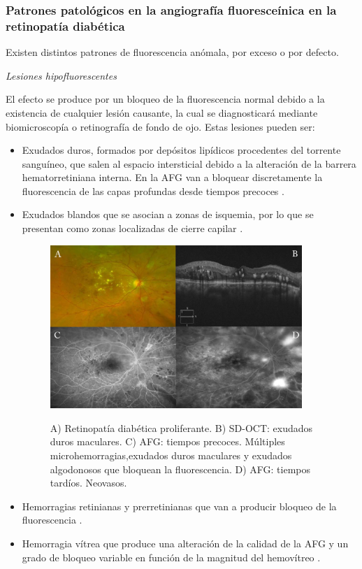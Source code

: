 \subsubsection{Patrones patológicos en la angiografía fluoresceínica en la retinopatía diabética}

Existen distintos patrones de fluorescencia anómala, por exceso o por defecto.
\\
 
  
\begin{large}
 \textit{Lesiones hipofluorescentes}
\end{large}

El efecto se produce por un bloqueo de la fluorescencia normal debido a la existencia de cualquier lesión causante, la cual se diagnosticará mediante biomicroscopía o retinografía de fondo de ojo. Estas lesiones pueden ser:
\begin{itemize}
\item Exudados duros, formados por depósitos lipídicos procedentes del torrente sanguíneo, que salen al espacio intersticial debido a la alteración de la barrera hematorretiniana interna. En la AFG van a bloquear discretamente la fluorescencia de las capas profundas desde tiempos precoces .
\item Exudados blandos que se asocian a zonas de isquemia, por lo que se presentan como zonas localizadas de cierre capilar .

\begin{figure}[H]
\centering
\includegraphics[width=0.9\textwidth]{./Figures/AF_HIPOFLUORECINA.png}
\label{fig:lightfilter}
\caption{ A) Retinopatía diabética proliferante. B) SD-OCT: exudados duros maculares. C) AFG: tiempos precoces. Múltiples microhemorragias,exudados duros maculares y exudados algodonosos que bloquean la fluorescencia. D) AFG: tiempos tardíos. Neovasos.}
\end{figure}

\item Hemorragias retinianas y prerretinianas que van a producir bloqueo de la fluorescencia .
\item  Hemorragia vítrea que produce una alteración de la calidad de la AFG y un grado de bloqueo variable en función de la magnitud del hemovítreo .  
\end{itemize}


